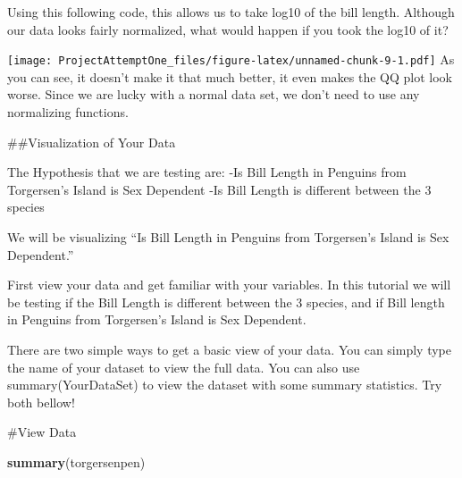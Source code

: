 \documentclass[
]{article}
\newenvironment{Shaded}{\begin{snugshade}}{\end{snugshade}}
\newcommand{\FunctionTok}[1]{\textcolor[rgb]{0.13,0.29,0.53}{\textbf{#1}}}
\newcommand{\NormalTok}[1]{#1}
\newcommand{\OtherTok}[1]{\textcolor[rgb]{0.56,0.35,0.01}{#1}}
\newcommand{\SpecialCharTok}[1]{\textcolor[rgb]{0.81,0.36,0.00}{\textbf{#1}}}
\begin{document}
Using this following code, this allows us to take log10 of the bill
length. Although our data looks fairly normalized, what would happen if
you took the log10 of it?

\begin{Shaded}
\end{Shaded}

\texttt{[image: ProjectAttemptOne\_files/figure-latex/unnamed-chunk-9-1.pdf]}
As you can see, it doesn't make it that much better, it even makes the
QQ plot look worse. Since we are lucky with a normal data set, we don't
need to use any normalizing functions.

\#\#Visualization of Your Data

The Hypothesis that we are testing are: -Is Bill Length in Penguins from
Torgersen's Island is Sex Dependent -Is Bill Length is different between
the 3 species

We will be visualizing ``Is Bill Length in Penguins from Torgersen's
Island is Sex Dependent.''

First view your data and get familiar with your variables. In this
tutorial we will be testing if the Bill Length is different between the
3 species, and if Bill length in Penguins from Torgersen's Island is Sex
Dependent.

There are two simple ways to get a basic view of your data. You can
simply type the name of your dataset to view the full data. You can also
use summary(YourDataSet) to view the dataset with some summary
statistics. Try both bellow!

\#View Data

\begin{Shaded}
\begin{Highlighting}[]
\FunctionTok{summary}\NormalTok{(torgersenpen)}
\end{Highlighting}
\end{Shaded}
\end{document}
